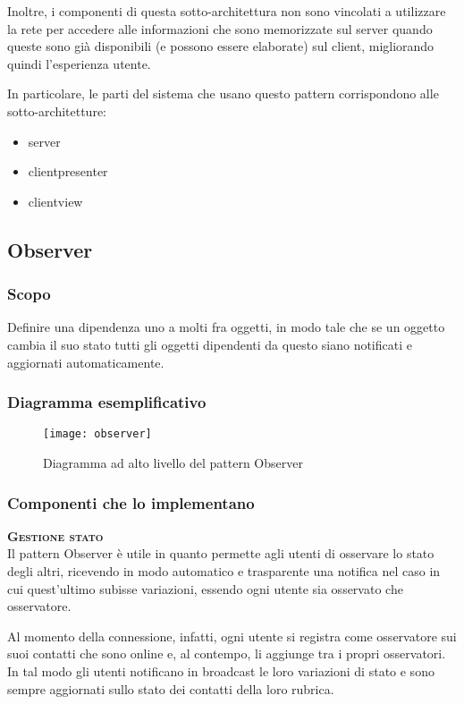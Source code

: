 Inoltre, i componenti di questa sotto-architettura non sono vincolati a utilizzare la rete per accedere alle informazioni che sono memorizzate sul server quando queste sono già disponibili (e possono essere elaborate) sul client, migliorando quindi l'esperienza utente.

In particolare, le parti del sistema che usano questo pattern corrispondono alle sotto-architetture:
\begin{itemize}[noitemsep,nolistsep]
  \item server
  \item clientpresenter
  \item clientview
\end{itemize}

\subsection{Observer}

\subsubsection{Scopo}
Definire una dipendenza uno a molti fra oggetti, in modo tale che se un oggetto cambia il suo stato tutti gli oggetti dipendenti da questo siano notificati e aggiornati automaticamente.

\subsubsection{Diagramma esemplificativo}
\begin{figure}[H]
\centering
\texttt{[image: observer]}
\caption{Diagramma ad alto livello del pattern Observer}\label{fig:observer}
\end{figure}

\subsubsection{Componenti che lo implementano}
\begin{description}
  \item{\scshape\bfseries Gestione stato}\\
Il pattern Observer è utile in quanto permette agli utenti di osservare lo stato degli altri, ricevendo in modo automatico e trasparente una notifica nel caso in cui quest'ultimo subisse variazioni, essendo ogni utente sia osservato che osservatore.

Al momento della connessione, infatti, ogni utente si registra come osservatore sui suoi contatti che sono online e, al contempo, li aggiunge tra i propri osservatori. In tal modo gli utenti notificano in broadcast le loro variazioni di stato e sono sempre aggiornati sullo stato dei contatti della loro rubrica.
\end{description}

